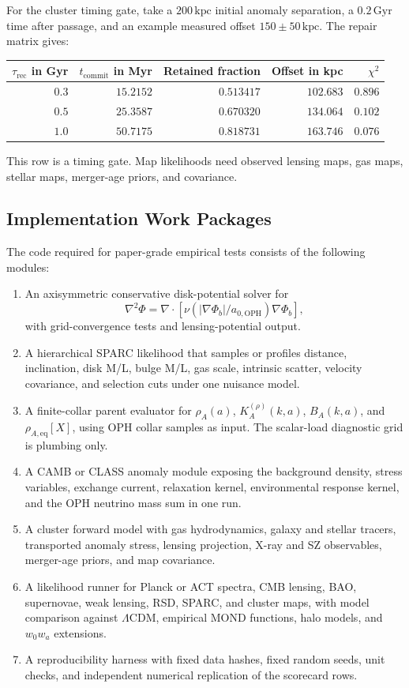 \documentclass[11pt]{article}
\newcommand{\LCDM}{\Lambda\mathrm{CDM}}
\newcommand{\aoph}{a_{0,\mathrm{OPH}}}
\begin{document}
For the cluster timing gate, take a \(200\,\mathrm{kpc}\) initial anomaly
separation, a \(0.2\,\mathrm{Gyr}\) time after passage, and an example measured
offset \(150\pm50\,\mathrm{kpc}\).  The repair matrix gives:
\begin{center}
\begin{tabular}{@{}rrrrr@{}}
\toprule
\(\tau_{\mathrm{rec}}\) in Gyr & \(t_{\mathrm{commit}}\) in Myr &
Retained fraction & Offset in kpc & \(\chi^2\) \\
\midrule
\(0.3\) & \(15.2152\) & \(0.513417\) & \(102.683\) & \(0.896\) \\
\(0.5\) & \(25.3587\) & \(0.670320\) & \(134.064\) & \(0.102\) \\
\(1.0\) & \(50.7175\) & \(0.818731\) & \(163.746\) & \(0.076\) \\
\bottomrule
\end{tabular}
\end{center}
This row is a timing gate.  Map likelihoods need observed lensing maps, gas
maps, stellar maps, merger-age priors, and covariance.

\subsection{Implementation Work Packages}

The code required for paper-grade empirical tests consists of the following
modules:
\begin{enumerate}
\item An axisymmetric conservative disk-potential solver for
\[
  \nabla^2\Phi
  =
  \nabla\cdot[\nu(|\nabla\Phi_b|/\aoph)\nabla\Phi_b],
\]
with grid-convergence tests and lensing-potential output.
\item A hierarchical SPARC likelihood that samples or profiles distance,
inclination, disk M/L, bulge M/L, gas scale, intrinsic scatter, velocity
covariance, and selection cuts under one nuisance model.
\item A finite-collar parent evaluator for \(\rho_A(a)\),
\(K_A^{(\rho)}(k,a)\), \(B_A(k,a)\), and
\(\rho_{A,\mathrm{eq}}[X]\), using OPH collar samples as input.  The
scalar-load diagnostic grid is plumbing only.
\item A CAMB or CLASS anomaly module exposing the background density, stress
variables, exchange current, relaxation kernel, environmental response
kernel, and the OPH neutrino mass sum in one run.
\item A cluster forward model with gas hydrodynamics, galaxy and stellar
tracers, transported anomaly stress, lensing projection, X-ray and SZ
observables, merger-age priors, and map covariance.
\item A likelihood runner for Planck or ACT spectra, CMB lensing, BAO,
supernovae, weak lensing, RSD, SPARC, and cluster maps, with model comparison
against \(\LCDM\), empirical MOND functions, halo models, and \(w_0w_a\)
extensions.
\item A reproducibility harness with fixed data hashes, fixed random seeds,
unit checks, and independent numerical replication of the scorecard rows.
\end{enumerate}
\end{document}
